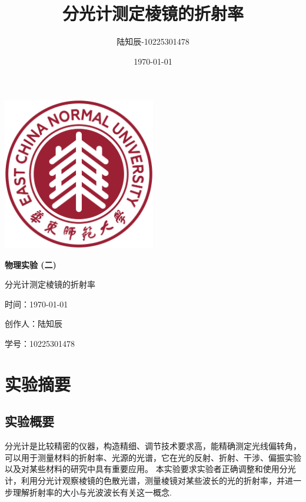 \documentclass{ctexart}
\title{分光计测定棱镜的折射率}
\author{陆知辰-10225301478}
\date{\today}
\begin{document}
\begin{titlepage}
  \centering
  \includegraphics[width=0.5\textwidth]{ecnu.png}
  
  \vspace*{\baselineskip}
  
  \Huge\textbf{物\quad 理\quad 实\quad 验 \quad (二)}
  \vspace*{0.3\baselineskip}
  
  \huge 分光计测定棱镜的折射率
  
  \vspace*{2\baselineskip}
  
  \large 时间：\today
  
  \vspace*{\baselineskip}
  
  \large 创作人：陆知辰
  
  \vspace*{\baselineskip}
  
  \large 学号：10225301478
  
\end{titlepage}
\newpage
\tableofcontents
\newpage
\section{实验摘要}
  \subsection{实验概要}
  分光计是比较精密的仪器，构造精细、调节技术要求高，能精确测定光线偏转角，
  可以用于测量材料的折射率、光源的光谱，它在光的反射、折射、干涉、偏振实验以及对某些材料的研究中具有重要应用。
  本实验要求实验者正确调整和使用分光计，利用分光计观察棱镜的色散光谱，测量棱镜对某些波长的光的折射率，并进一步理解折射率的大小与光波波长有关这一概念.
\end{document}
